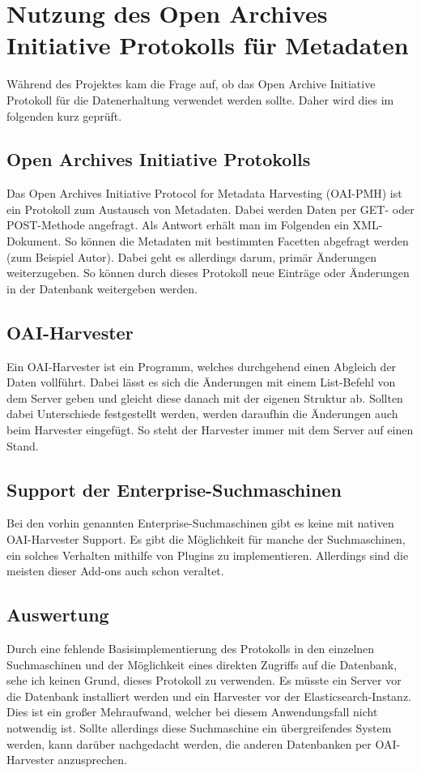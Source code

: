 \chapter{Nutzung des Open Archives Initiative Protokolls für Metadaten}

Während des Projektes kam die Frage auf, ob das Open Archive Initiative Protokoll für die Datenerhaltung verwendet werden sollte. Daher wird dies im folgenden kurz geprüft.


\section{Open Archives Initiative Protokolls}

Das Open Archives Initiative Protocol for Metadata Harvesting (OAI-PMH) ist ein Protokoll zum Austausch von Metadaten. Dabei werden Daten per GET- oder POST-Methode angefragt. Als Antwort erhält man im Folgenden ein XML-Dokument. So können die Metadaten mit bestimmten Facetten abgefragt werden (zum Beispiel Autor). Dabei geht es allerdings darum, primär Änderungen weiterzugeben. So können durch dieses Protokoll neue Einträge oder Änderungen in der Datenbank weitergeben werden.
\cite{DeutscheNationalBibliothek.2019}

\section{OAI-Harvester}

Ein OAI-Harvester ist ein Programm, welches durchgehend einen Abgleich der Daten vollführt. Dabei lässt es sich die Änderungen mit einem List-Befehl von dem Server geben und gleicht diese danach mit der eigenen Struktur ab. Sollten dabei Unterschiede festgestellt werden, werden daraufhin die Änderungen auch beim Harvester eingefügt. So steht der Harvester immer mit dem Server auf einen Stand.
\cite{DeutscheNationalBibliothek.2019}

\section{Support der Enterprise-Suchmaschinen}

Bei den vorhin genannten Enterprise-Suchmaschinen gibt es keine mit nativen OAI-Harvester Support. Es gibt die Möglichkeit für manche der Suchmaschinen, ein solches Verhalten mithilfe von Plugins zu implementieren. Allerdings sind die meisten dieser Add-ons auch schon veraltet.

\section{Auswertung}

Durch eine fehlende Basisimplementierung des Protokolls in den einzelnen Suchmaschinen und der Möglichkeit eines direkten Zugriffs auf die Datenbank, sehe ich keinen Grund, dieses Protokoll zu verwenden. Es müsste ein Server vor die Datenbank installiert werden und ein Harvester vor der Elasticsearch-Instanz. Dies ist ein großer Mehraufwand, welcher bei diesem Anwendungsfall nicht notwendig ist. Sollte allerdings diese Suchmaschine ein übergreifendes System werden, kann darüber nachgedacht werden, die anderen Datenbanken per OAI-Harvester anzusprechen.